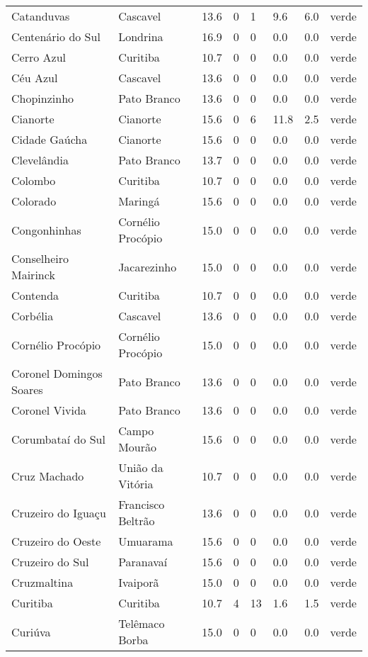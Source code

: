 \begin{longtable}{l|lllllll}
  Catanduvas & Cascavel & 13.6 & 0 & 1 & 9.6 & 6.0 & verde \\ 
  Centenário do Sul & Londrina & 16.9 & 0 & 0 & 0.0 & 0.0 & verde \\ 
  Cerro Azul & Curitiba & 10.7 & 0 & 0 & 0.0 & 0.0 & verde \\ 
  Céu Azul & Cascavel & 13.6 & 0 & 0 & 0.0 & 0.0 & verde \\ 
  Chopinzinho & Pato Branco & 13.6 & 0 & 0 & 0.0 & 0.0 & verde \\ 
  Cianorte & Cianorte & 15.6 & 0 & 6 & 11.8 & 2.5 & verde \\ 
  Cidade Gaúcha & Cianorte & 15.6 & 0 & 0 & 0.0 & 0.0 & verde \\ 
  Clevelândia & Pato Branco & 13.7 & 0 & 0 & 0.0 & 0.0 & verde \\ 
  Colombo & Curitiba & 10.7 & 0 & 0 & 0.0 & 0.0 & verde \\ 
  Colorado & Maringá & 15.6 & 0 & 0 & 0.0 & 0.0 & verde \\ 
  Congonhinhas & Cornélio Procópio & 15.0 & 0 & 0 & 0.0 & 0.0 & verde \\ 
  Conselheiro Mairinck & Jacarezinho & 15.0 & 0 & 0 & 0.0 & 0.0 & verde \\ 
  Contenda & Curitiba & 10.7 & 0 & 0 & 0.0 & 0.0 & verde \\ 
  Corbélia & Cascavel & 13.6 & 0 & 0 & 0.0 & 0.0 & verde \\ 
  Cornélio Procópio & Cornélio Procópio & 15.0 & 0 & 0 & 0.0 & 0.0 & verde \\ 
  Coronel Domingos Soares & Pato Branco & 13.6 & 0 & 0 & 0.0 & 0.0 & verde \\ 
  Coronel Vivida & Pato Branco & 13.6 & 0 & 0 & 0.0 & 0.0 & verde \\ 
  Corumbataí do Sul & Campo Mourão & 15.6 & 0 & 0 & 0.0 & 0.0 & verde \\ 
  Cruz Machado & União da Vitória & 10.7 & 0 & 0 & 0.0 & 0.0 & verde \\ 
  Cruzeiro do Iguaçu & Francisco Beltrão & 13.6 & 0 & 0 & 0.0 & 0.0 & verde \\ 
  Cruzeiro do Oeste & Umuarama & 15.6 & 0 & 0 & 0.0 & 0.0 & verde \\ 
  Cruzeiro do Sul & Paranavaí & 15.6 & 0 & 0 & 0.0 & 0.0 & verde \\ 
  Cruzmaltina & Ivaiporã & 15.0 & 0 & 0 & 0.0 & 0.0 & verde \\ 
  Curitiba & Curitiba & 10.7 & 4 & 13 & 1.6 & 1.5 & verde \\ 
  Curiúva & Telêmaco Borba & 15.0 & 0 & 0 & 0.0 & 0.0 & verde \\ 

\end{longtable}
